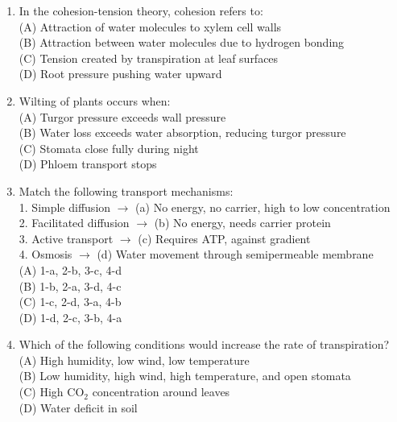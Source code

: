 \documentclass{article}
\begin{document}
\begin{enumerate}[label=Q\arabic*.]
\item In the cohesion-tension theory, cohesion refers to:
\\(A) Attraction of water molecules to xylem cell walls
\\(B) Attraction between water molecules due to hydrogen bonding
\\(C) Tension created by transpiration at leaf surfaces
\\(D) Root pressure pushing water upward

\item Wilting of plants occurs when:
\\(A) Turgor pressure exceeds wall pressure
\\(B) Water loss exceeds water absorption, reducing turgor pressure
\\(C) Stomata close fully during night
\\(D) Phloem transport stops

\item Match the following transport mechanisms:\\
1. Simple diffusion $\rightarrow$ (a) No energy, no carrier, high to low concentration\\
2. Facilitated diffusion $\rightarrow$ (b) No energy, needs carrier protein\\
3. Active transport $\rightarrow$ (c) Requires ATP, against gradient\\
4. Osmosis $\rightarrow$ (d) Water movement through semipermeable membrane
\\(A) 1-a, 2-b, 3-c, 4-d
\\(B) 1-b, 2-a, 3-d, 4-c
\\(C) 1-c, 2-d, 3-a, 4-b
\\(D) 1-d, 2-c, 3-b, 4-a

\item Which of the following conditions would increase the rate of transpiration?
\\(A) High humidity, low wind, low temperature
\\(B) Low humidity, high wind, high temperature, and open stomata
\\(C) High CO$_2$ concentration around leaves
\\(D) Water deficit in soil

\end{enumerate}
\end{document}
